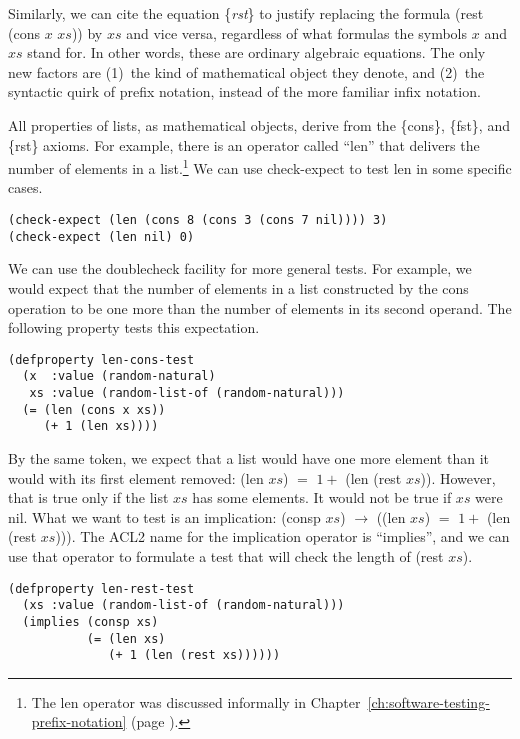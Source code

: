 Similarly, we can cite the equation \{\emph{rst}\} to justify
replacing the formula (rest (cons $x$ $xs$)) by $xs$
and vice versa, regardless of what formulas the symbols $x$ and $xs$ stand for.
In other words, these are ordinary algebraic equations.
The only new factors are
(1)~the kind of mathematical object they denote, and
(2)~the syntactic quirk of prefix notation, instead of the more familiar infix notation.

All properties of lists,
as mathematical objects,
derive from the \{cons\}, \{fst\}, and \{rst\} axioms.
For example, there is an operator called ``len''
that delivers the number of elements in a list.\footnote{The
len operator was discussed informally in Chapter~\ref{ch:software-testing-prefix-notation}
(page \pageref{len-op-informal}).}
We can use check-expect to test len in some specific cases.

\begin{Verbatim}
(check-expect (len (cons 8 (cons 3 (cons 7 nil)))) 3)
(check-expect (len nil) 0)
\end{Verbatim}

We can use the doublecheck facility for more general tests.
For example, we would expect that the number of elements
in a list constructed by the cons operation to be
one more than the number of elements in its second operand.
The following property tests this expectation.

\begin{Verbatim}
(defproperty len-cons-test
  (x  :value (random-natural)
   xs :value (random-list-of (random-natural)))
  (= (len (cons x xs))
     (+ 1 (len xs))))
\end{Verbatim}

By the same token, we expect that a list would
have one more element than it would with
its first element removed: (len $xs$) $=$ $1 +$ (len (rest $xs$)).
However, that is true only if the list $xs$
has some elements. It would not be true if $xs$ were nil.
What we want to test is an implication:
(consp $xs$) $\rightarrow$ ((len $xs$) $=$ $1 +$ (len (rest $xs$))).
The ACL2 name for the implication operator is ``implies'',
and we can use that operator to formulate a test that
will check the length of (rest $xs$).

\begin{Verbatim}
(defproperty len-rest-test
  (xs :value (random-list-of (random-natural)))
  (implies (consp xs)
           (= (len xs)
              (+ 1 (len (rest xs))))))
\end{Verbatim}

